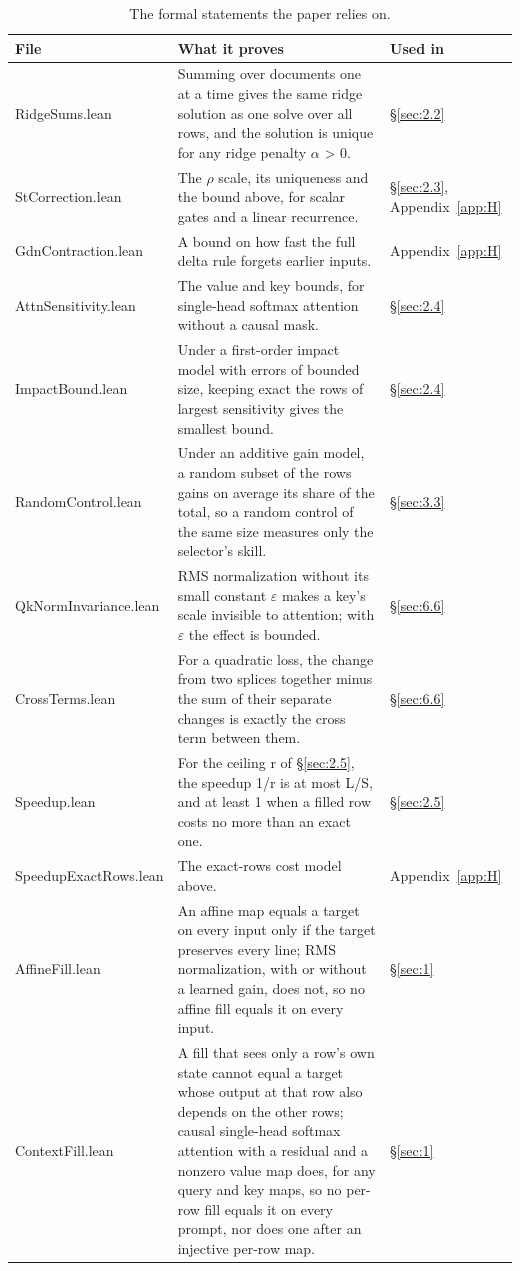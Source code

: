 \documentclass[11pt]{article}
\begin{document}
\begin{table}[H]
\centering
\caption{The formal statements the paper relies on.}\label{tab:H.1}
\footnotesize
\setlength{\tabcolsep}{4pt}
\begin{tabularx}{\linewidth}{l>{\raggedright\arraybackslash\hsize=1.505\hsize}X>{\raggedright\arraybackslash\hsize=0.495\hsize}X}
\toprule
File & What it proves & Used in \\
\midrule
RidgeSums.lean & Summing over documents one at a time gives the same ridge solution as one solve over all rows, and the solution is unique for any ridge penalty $\alpha$ \textgreater{} 0. & \S\ref{sec:2.2} \\
StCorrection.lean & The $\rho$ scale, its uniqueness and the bound above, for scalar gates and a linear recurrence. & \S\ref{sec:2.3}, Appendix~\ref{app:H} \\
GdnContraction.lean & A bound on how fast the full delta rule forgets earlier inputs. & Appendix~\ref{app:H} \\
AttnSensitivity.lean & The value and key bounds, for single-head softmax attention without a causal mask. & \S\ref{sec:2.4} \\
ImpactBound.lean & Under a first-order impact model with errors of bounded size, keeping exact the rows of largest sensitivity gives the smallest bound. & \S\ref{sec:2.4} \\
RandomControl.lean & Under an additive gain model, a random subset of the rows gains on average its share of the total, so a random control of the same size measures only the selector's skill. & \S\ref{sec:3.3} \\
QkNormInvariance.lean & RMS normalization without its small constant $\varepsilon$ makes a key's scale invisible to attention; with $\varepsilon$ the effect is bounded. & \S\ref{sec:6.6} \\
CrossTerms.lean & For a quadratic loss, the change from two splices together minus the sum of their separate changes is exactly the cross term between them. & \S\ref{sec:6.6} \\
Speedup.lean & For the ceiling r of \S\ref{sec:2.5}, the speedup 1/\allowbreak{}r is at most L/\allowbreak{}S, and at least 1 when a filled row costs no more than an exact one. & \S\ref{sec:2.5} \\
SpeedupExactRows.lean & The exact-rows cost model above. & Appendix~\ref{app:H} \\
AffineFill.lean & An affine map equals a target on every input only if the target preserves every line; RMS normalization, with or without a learned gain, does not, so no affine fill equals it on every input. & \S\ref{sec:1} \\
ContextFill.lean & A fill that sees only a row's own state cannot equal a target whose output at that row also depends on the other rows; causal single-head softmax attention with a residual and a nonzero value map does, for any query and key maps, so no per-row fill equals it on every prompt, nor does one after an injective per-row map. & \S\ref{sec:1} \\
\bottomrule
\end{tabularx}
\end{table}
\end{document}
